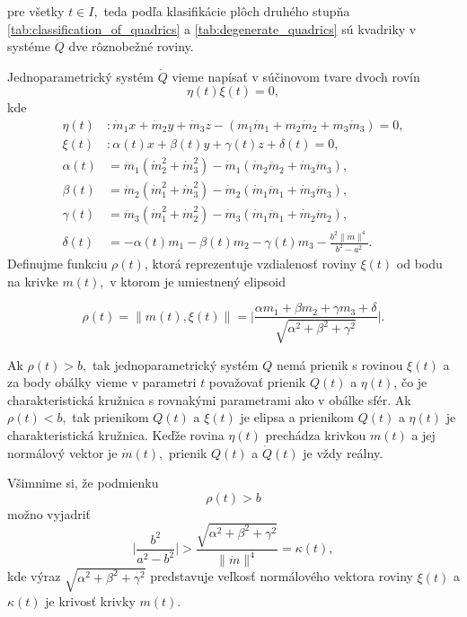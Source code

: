 pre všetky $t \in I,$
teda podľa klasifikácie plôch druhého stupňa \ref{tab:classification_of_quadrics} a \ref{tab:degenerate_quadrics} sú kvadriky v systéme $\dot{Q}$ dve rôznobežné roviny.

Jednoparametrický systém $\dot{Q}$ vieme napísať v súčinovom tvare dvoch rovín 
$$ \eta (t) \xi (t) = 0,$$
kde 
\begin{align*}
\eta(t) & \colon \dot{m}_1 x + \dot{m}_2 y + \dot{m}_3 z - (m_1 \dot{m}_1 + m_2 \dot{m}_2 + m_3 \dot{m}_3) = 0, \\
\xi(t) & \colon  \alpha (t) x + \beta (t) y + \gamma (t) z + \delta (t) = 0, \\
\alpha (t) &= \ddot{m}_1 (\dot{m}_2^2 + \dot{m}_3^2) - \dot{m}_1(\dot{m}_2 \ddot{m}_2 + \dot{m}_3 \ddot{m}_3) , \\
\beta (t) &= \ddot{m}_2 (\dot{m}_1^2 + \dot{m}_3^2) - \dot{m}_2(\dot{m}_1 \ddot{m}_1 + \dot{m}_3 \ddot{m}_3), \\
\gamma (t) &= \ddot{m}_3 (\dot{m}_1^2 + \dot{m}_2^2) - \dot{m}_3(\dot{m}_1 \ddot{m}_1 + \dot{m}_2 \ddot{m}_2), \\
\delta (t) &= - \alpha (t) m_1 - \beta (t) m_2 - \gamma (t) m_3 - \frac{b^2 \| \dot{m} \|^4 }{b^2 - a^2}.
\end{align*}
Definujme funkciu $\rho(t)$, ktorá reprezentuje vzdialenosť roviny $\xi(t)$ od bodu na krivke $m(t),$ v ktorom je umiestnený elipsoid

$$
\rho (t) = \| m(t), \xi(t) \|= \bigg|  \frac{\alpha m_1 + \beta m_2 + \gamma m_3 + \delta}{\sqrt{\alpha^2 + \beta^2 + \gamma^2}} \bigg|.
$$

Ak $\rho(t) > b,$ tak jednoparametrický systém $Q$ nemá prienik s rovinou $\xi(t) $ a za body obálky vieme v parametri $t$ považovať prienik $Q(t)$ a $\eta(t)$, čo je charakteristická kružnica s rovnakými parametrami ako v obálke sfér. Ak $\rho(t) < b,$ tak prienikom $Q(t)$ a $\xi(t)$ je elipsa a prienikom $Q(t)$ a $\eta(t)$ je charakteristická kružnica. Keďže rovina $\eta(t)$ prechádza krivkou $m(t)$ a jej normálový vektor je $\dot{m}(t),$ prienik $Q(t)$ a $\dot{Q}(t)$ je vždy reálny.

Všimnime si, že podmienku
$$
\rho (t) > b 
$$
možno vyjadriť
$$
\bigg| \frac{b^2}{a^2 - b^2} \bigg| > \frac{\sqrt{\alpha^2 + \beta^2 + \gamma^2}}{\| \dot{m} \|^4} = \kappa (t),
$$
kde výraz $ \sqrt{\alpha^2 + \beta^2 + \gamma^2} $ predstavuje veľkosť normálového vektora roviny $\xi(t)$ a $\kappa(t)$ je krivosť krivky $m(t).$

